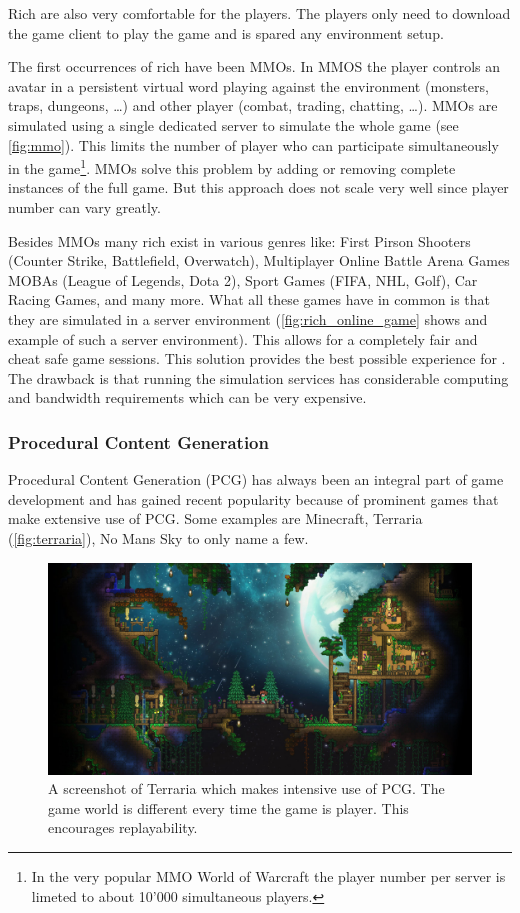 Rich \ogs{} are also very comfortable for the players. The players only need to
download the game client to play the game and is spared any environment setup.

The first occurrences of rich \og{} have been MMOs. In MMOS the player controls
an avatar in a persistent virtual word playing against the environment
(monsters, traps, dungeons, \ldots) and other player (combat, trading, chatting,
\ldots). MMOs are simulated using a single dedicated server to simulate the
whole game (see \autoref{fig:mmo}). This limits the number of player who can
participate simultaneously in the game\footnote{In the very popular MMO World of
Warcraft the player number per server is limeted to about 10'000 simultaneous
players.}. MMOs solve this problem by adding or removing complete instances of
the full game. But this approach does not scale very well since player number
can vary greatly.

Besides MMOs many rich \ogs{} exist in various genres like: First Pirson
Shooters (Counter Strike, Battlefield, Overwatch), Multiplayer Online Battle
Arena Games MOBAs (League of Legends, Dota 2), Sport Games (FIFA, NHL, Golf),
Car Racing Games, and many more. What all these games have in common is that
they are simulated in a server environment (\autoref{fig:rich_online_game} shows
and example of such a server environment). This allows for a completely fair and
cheat safe game sessions. This solution provides the best possible experience
for \ogs{}. The drawback is that running the simulation services has
considerable computing and bandwidth requirements which can be very expensive.

\subsubsection{Procedural Content Generation}

Procedural Content Generation (PCG) has always been an integral part of game
development and has gained recent popularity because of prominent games that
make extensive use of PCG. Some examples are Minecraft, Terraria
(\autoref{fig:terraria}), No Mans Sky to only name a few.

\begin{figure}
	\centering
	\includegraphics[width=\textwidth]{images/terraria}
	\caption{A screenshot of Terraria which makes intensive use of PCG. The game
	world is different every time the game is player. This encourages
	replayability.}
	\label{fig:terraria}
\end{figure}

